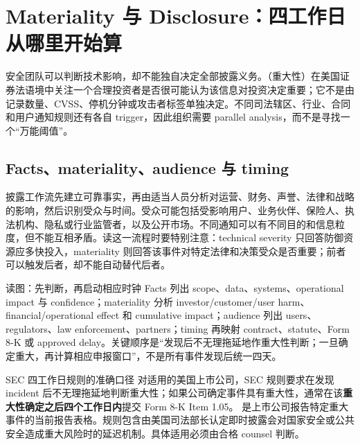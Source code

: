 \section{Materiality 与 Disclosure：四工作日从哪里开始算}

安全团队可以判断技术影响，却不能独自决定全部披露义务。（重大性）在美国证券法语境中关注一个合理投资者是否很可能认为该信息对投资决定重要；它不是由记录数量、CVSS、停机分钟或攻击者标签单独决定。不同司法辖区、行业、合同和用户通知规则还有各自 trigger，因此组织需要 parallel analysis，而不是寻找一个“万能阈值”。

\subsection{Facts、materiality、audience 与 timing}

披露工作流先建立可靠事实，再由适当人员分析对运营、财务、声誉、法律和战略的影响，然后识别受众与时间。受众可能包括受影响用户、业务伙伴、保险人、执法机构、隐私或行业监管者，以及公开市场。不同通知可以有不同目的和信息粒度，但不能互相矛盾。读这一流程时要特别注意：technical severity 只回答防御资源应多快投入，materiality 则回答该事件对特定法律和决策受众是否重要；前者可以触发后者，却不能自动替代后者。


\begin{knowledgebox}{读图：先判断，再启动相应时钟}
Facts 列出 scope、data、systems、operational impact 与 confidence；materiality 分析 investor/customer/user harm、financial/operational effect 和 cumulative impact；audience 列出 users、regulators、law enforcement、partners；timing 再映射 contract、statute、Form 8-K 或 approved delay。关键顺序是“发现后不无理拖延地作重大性判断；一旦确定重大，再计算相应申报窗口”，不是所有事件发现后统一四天。
\end{knowledgebox}

\begin{importantbox}{SEC 四工作日规则的准确口径}
对适用的美国上市公司，SEC 规则要求在发现 incident 后不无理拖延地判断重大性；如果公司确定事件具有重大性，通常在该\textbf{重大性确定之后四个工作日内}提交 Form 8-K Item 1.05。 是上市公司报告特定重大事件的当前报告表格。规则包含由美国司法部长认定即时披露会对国家安全或公共安全造成重大风险时的延迟机制。具体适用必须由合格 counsel 判断。
\end{importantbox}

